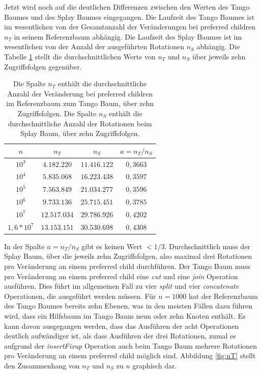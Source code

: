\documentclass[a4paper,12pt]{article}
\begin{document}
Jetzt wird noch auf die deutlichen Differenzen zwischen den Werten des Tango Baumes und des Splay Baumes eingegangen. Die Laufzeit des Tango Baumes ist im wesentlichen von der Gesamtanzahl der Veränderungen  bei preferred children $n_T$ in seinem Referenzbaum  abhängig. Die Laufzeit des Splay Baumes ist im wesentlichen von der Anzahl der ausgeführten Rotationen $n_S$ abhängig. Die Tabelle \ref{tab:Ran} stellt die durchschnittlichen Werte von $n_T$ und $n_S$ über jeweils zehn Zugriffsfolgen gegenüber.    
\begin{table}[H] 
	\begin{center}
		\begin{tabular}	[c]{|c|c|c|c|}  
			\hline
			$n$ & $n_T$ & $n_S$ & $a = n_T / n_S$\\
			\hline
			$10^3$ & $4.182.220$ &$11.416.122$ &$0,3663$\\
			\hline
			$10^4$  & $5.835.068$ &$16.223.438$&$0,3597$  \\
			\hline
			$10^5$  & $7.563.849$ &$21.034.277$ & $0,3596$\\
			\hline
			$10^6$  & $9.733.136$ &$25.715.451$ & $0,3785$\\
			\hline
			$10^7$  & $12.517.034$ &$29.786.926$ & $0,4202$\\
			\hline
			$1,6 * 10^7$  & $13.153.151$ &$30.530.698$ & $0,4308$ \\
			\hline
		\end{tabular}
		\caption{Die Spalte $n_T$ enthält die durchschnittliche Anzahl der Veränderung bei preferred children im Referenzbaum zum Tango Baum, über zehn Zugriffsfolgen. Die Spalte $n_S$ enthält die durchschnittliche Anzahl der Rotationen beim Splay Baum, über zehn Zugriffsfolgen.   }  
		\label{tab:Ran}
	\end{center}
\end{table}
\noindent In der Spalte $a = n_T / n_S$ gibt es  keinen Wert $< 1/3$. Durchschnittlich muss der Splay Baum, über die jeweils zehn Zugriffsfolgen, also maximal drei Rotationen pro Veränderung an einem preferred child durchführen. Der Tango Baum muss pro Veränderung an einem preferred child eine \textit{cut} und eine \textit{join} Operation ausführen. Dies führt im allgemeinen Fall zu vier \textit{split} und vier \textit{concatenate} Operationen,  die ausgeführt werden müssen. Für $n = 1000$ hat der Referenzbaum des Tango Baumes bereits zehn Ebenen, was in den meisten Fällen dazu führen wird, dass ein Hilfsbaum im Tango Baum neun oder zehn Knoten enthält. Es kann davon ausgegangen werden, dass das Ausführen der acht Operationen deutlich aufwändiger ist, als dass Ausführen der drei Rotationen, zumal es aufgrund der \textit{insertFixup} Operation auch beim Tango Baum mehrere Rotationen pro Veränderung an einem preferred child möglich sind. Abbildung \ref{fig:nT} stellt den Zusammenhang von $n_T$ und $n_S$ zu $n$ graphisch dar. 
\end{document}
